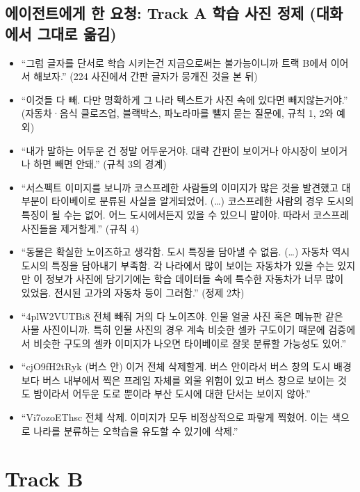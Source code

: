 \documentclass[11pt]{article}
\begin{document}
\subsection*{에이전트에게 한 요청: Track A 학습 사진 정제 (대화에서 그대로 옮김)}
\begin{itemize}
\item ``그럼 글자를 단서로 학습 시키는건 지금으로써는 불가능이니까 트랙 B에서 이어서 해보자.'' (224 사진에서 간판 글자가 뭉개진 것을 본 뒤)
\item ``이것들 다 빼. 다만 명확하게 그 나라 텍스트가 사진 속에 있다면 빼지않는거야.'' (자동차·음식 클로즈업, 블랙박스, 파노라마를 뺄지 묻는 질문에, 규칙 1, 2와 예외)
\item ``내가 말하는 어두운 건 정말 어두운거야. 대략 간판이 보이거나 야시장이 보이거나 하면 빼면 안돼.'' (규칙 3의 경계)
\item ``서스펙트 이미지를 보니까 코스프레한 사람들의 이미지가 많은 것을 발견했고 대부분이 타이베이로 분류된 사실을 알게되었어. (…) 코스프레한 사람의 경우 도시의 특징이 될 수는 없어. 어느 도시에서든지 있을 수 있으니 말이야. 따라서 코스프레 사진들을 제거할게.'' (규칙 4)
\item ``동물은 확실한 노이즈하고 생각함. 도시 특징을 담아낼 수 없음. (…) 자동차 역시 도시의 특징을 담아내기 부족함. 각 나라에서 많이 보이는 자동차가 있을 수는 있지만 이 정보가 사진에 담기기에는 학습 데이터들 속에 특수한 자동차가 너무 많이 있었음. 전시된 고가의 자동차 등이 그러함.'' (정제 2차)
\item ``4plW2VUTBi8 전체 빼줘 거의 다 노이즈야. 인물 얼굴 사진 혹은 메뉴판 같은 사물 사진이니까. 특히 인물 사진의 경우 계속 비슷한 셀카 구도이기 때문에 검증에서 비슷한 구도의 셀카 이미지가 나오면 타이베이로 잘못 분류할 가능성도 있어.''
\item ``cjO9fH2tRyk (버스 안) 이거 전체 삭제할게. 버스 안이라서 버스 창의 도시 배경보다 버스 내부에서 찍은 프레임 자체를 외울 위험이 있고 버스 창으로 보이는 것도 밤이라서 어두운 도로 뿐이라 부산 도시에 대한 단서는 보이지 않아.''
\item ``Vi7ozoEThsc 전체 삭제. 이미지가 모두 비정상적으로 파랗게 찍혔어. 이는 색으로 나라를 분류하는 오학습을 유도할 수 있기에 삭제.''
\end{itemize}

\section*{Track B}
\end{document}
